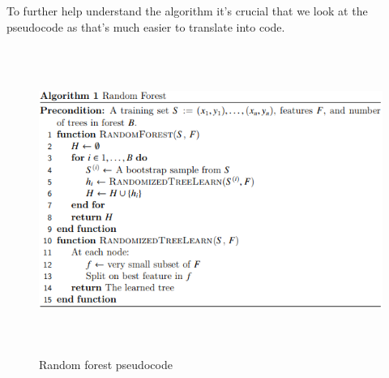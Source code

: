 \\
\\
To further help understand the algorithm it's crucial that we look at the pseudocode as that's much easier to translate into code.
\\
\begin{figure}[h]
	\includegraphics[width=150mm,height=100mm]{figures/pseudocode}
	\caption{Random forest pseudocode}
\end{figure}
\\

